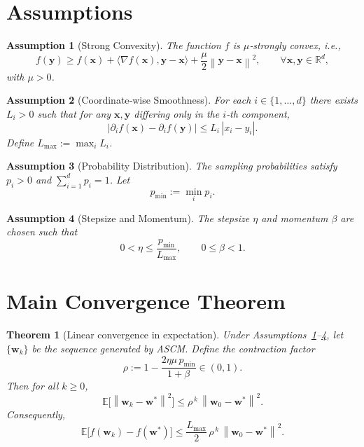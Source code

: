 \documentclass{article}
\newtheorem{theorem}{Theorem}
\newtheorem{assumption}{Assumption}
\newcommand{\E}{\mathbb{E}}
\newcommand{\R}{\mathbb{R}}
\newcommand{\norm}[1]{\left\|#1\right\|}
\begin{document}
\section*{Assumptions}
\begin{assumption}[Strong Convexity]\label{as:strong}
The function $f$ is $\mu$‑strongly convex, i.e.,
\[
f(\mathbf y)\ge f(\mathbf x)+\langle\nabla f(\mathbf x),\mathbf y-\mathbf x\rangle+\frac{\mu}{2}\norm{\mathbf y-\mathbf x}^2,
\qquad\forall\mathbf x,\mathbf y\in\R^d,
\]
with $\mu>0$.
\end{assumption}
\begin{assumption}[Coordinate‑wise Smoothness]\label{as:smooth}
For each $i\in\{1,\dots ,d\}$ there exists $L_i>0$ such that for any
$\mathbf x,\mathbf y$ differing only in the $i$‑th component,
\[
\bigl|\partial_i f(\mathbf x)-\partial_i f(\mathbf y)\bigr|
\le L_i\,|x_i-y_i|.
\]
Define $L_{\max}:=\max_i L_i$.
\end{assumption}
\begin{assumption}[Probability Distribution]\label{as:prob}
The sampling probabilities satisfy $p_i>0$ and $\sum_{i=1}^{d}p_i=1$.  Let
\[
p_{\min}:=\min_{i}p_i .
\]
\end{assumption}
\begin{assumption}[Stepsize and Momentum]\label{as:hyper}
The stepsize $\eta$ and momentum $\beta$ are chosen such that
\[
0<\eta\le\frac{p_{\min}}{L_{\max}},\qquad 0\le\beta<1 .
\]
\end{assumption}

\section*{Main Convergence Theorem}
\begin{theorem}[Linear convergence in expectation]\label{thm:linear}
Under Assumptions~\ref{as:strong}–\ref{as:hyper}, let $\{\mathbf w_k\}$ be the sequence generated by ASCM.
Define the contraction factor
\[
\rho:=1-\frac{2\eta\mu\,p_{\min}}{1+\beta}\in(0,1).
\]
Then for all $k\ge0$,
\[
\E\!\bigl[\norm{\mathbf w_k-\mathbf w^{*}}^{2}\bigr]\le\rho^{\,k}\,\norm{\mathbf w_0-\mathbf w^{*}}^{2}.
\]
Consequently,
\[
\E\!\bigl[f(\mathbf w_k)-f(\mathbf w^{*})\bigr]\le
\frac{L_{\max}}{2}\,\rho^{\,k}\,\norm{\mathbf w_0-\mathbf w^{*}}^{2}.
\]
\end{theorem}
\end{document}
